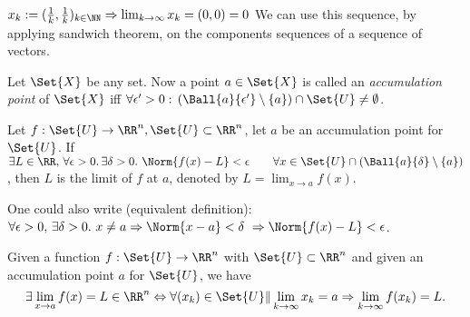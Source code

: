 \begin{exam}
 $x_k:=(\frac{1}{k},\frac{1}{k})_{k\in\NN}\Rightarrow \lim_{k\to\infty}x_k=(0,0)=0$
 We can use this sequence, by applying sandwich theorem, on the components sequences of a sequence of vectors.
\end{exam}
\begin{defn}
  Let $\Set{X}$ be any set. Now a point $a\in\Set{X}$ is called an \emph{accumulation point} of $\Set{X}$ iff $\forall \epsilon'>0:\,(\Ball{a}{\epsilon'}\setminus\{a\})\cap \Set{U}\neq \emptyset$. 
\end{defn}
\begin{defn}
 Let $f:\Set{U}\to\RR^n, \Set{U}\subset\RR^n$, let $a$ be an accumulation point for $\Set{U}$. If $\exists L\in\RR,\,\forall\epsilon>0.\,\exists\delta>0.\ \Norm{f(x)-L}<\epsilon\qquad\forall x\in \Set{U}\cap(\Ball{a}{\delta}\setminus\{a\})$, then $L$ is the limit of $f$ at $a$, denoted by $L=\lim_{x\to a}f(x)$. 
\end{defn}
\begin{rem}
 One could also write (equivalent definition): $\forall \epsilon>0,\,\exists\delta>0.\ x\neq a\Rightarrow\Norm{x-a}<\delta\ \Rightarrow\Norm{f(x)-L}<\epsilon$.
\end{rem}
\begin{lem}
 Given a function $f:\Set{U}\to\RR^n$ with $\Set{U}\subset\RR^n$ and given an accumulation point $a$ for $\Set{U}$, we have $$\exists\lim_{x\to a}f(x)=L\in\RR^n\Leftrightarrow\forall(x_k)\in\Set{U}\|\lim_{k\to\infty}x_k=a\Rightarrow \lim_{k\to\infty}f(x_k)=L.$$
\end{lem}

